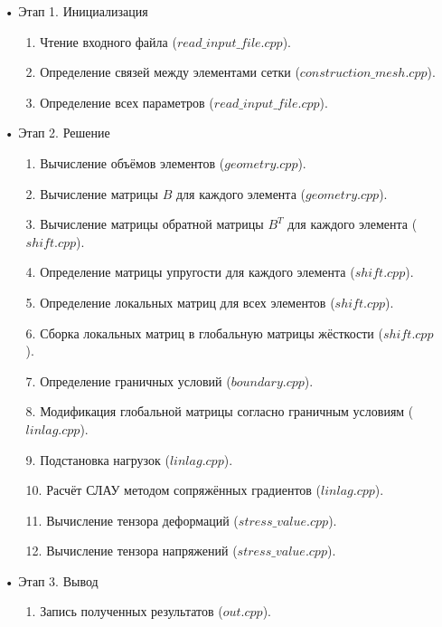 \documentclass[a4paper,12pt]{article}
\begin{document}
\begin{itemize}
 		\item[•] Этап 1. Инициализация
 	\begin{itemize}
 		\item[1.] Чтение входного файла ($read\_input\_file.cpp$).
 		\item[2.] Определение связей между элементами сетки ($construction\_mesh.cpp$).
 		\item[3.] Определение всех параметров ($read\_input\_file.cpp$).		 		
	\end{itemize} 		 			
 		
 		\item[•] Этап 2. Решение
 	\begin{itemize}
 		\item[1.] Вычисление объёмов элементов ($geometry.cpp$).		
 		\item[2.] Вычисление матрицы $B$ для каждого элемента ($geometry.cpp$).	
 		\item[3.] Вычисление матрицы обратной матрицы $B^T$ для каждого элемента ($shift.cpp$).	
 		\item[4.] Определение матрицы упругости для каждого элемента ($shift.cpp$).	
 		\item[5.] Определение локальных матриц для всех элементов ($shift.cpp$).	 				 		
 		\item[6.] Сборка локальных матриц в глобальную матрицы жёсткости ($shift.cpp$).	 
 		\item[7.] Определение граничных условий ($boundary.cpp$).	 
 		\item[8.] Модификация глобальной матрицы согласно граничным условиям ($linlag.cpp$).	   		 				 				 		
 		\item[9.] Подстановка нагрузок ($linlag.cpp$).	 		
 		\item[10.] Расчёт СЛАУ методом сопряжённых градиентов ($linlag.cpp$).	  		 				 				 		 		
 		\item[11.] Вычисление тензора деформаций ($stress\_value.cpp$).	
 		\item[12.] Вычисление тензора напряжений ($stress\_value.cpp$).			 		
	\end{itemize} 		
	
 		\item[•] Этап 3. Вывод
 	\begin{itemize}
 		\item[1.] Запись полученных результатов ($out.cpp$).		
	\end{itemize} 		
\end{itemize}	
		
\end{document}

